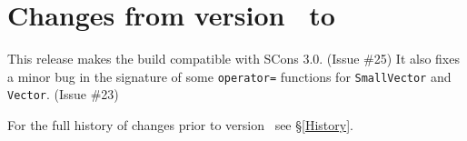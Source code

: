 
\section{Changes from version \prevtmvversion\ to \tmvversion}
\label{Changes}


This release makes the build compatible with SCons 3.0. (Issue \#25) 
It also fixes a minor bug in the signature of some \texttt{operator=} functions for
\texttt{SmallVector} and \texttt{Vector}.  (Issue \#23)

For the full history of changes prior to version \tmvversion\ see \S\ref{History}.
